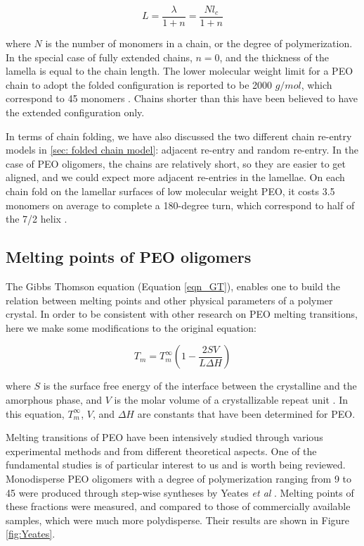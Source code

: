\begin{equation}
\label{eqn_thickness}
L = \dfrac{\lambda}{1+n} = \dfrac{N l_{c}}{1+n}
\end{equation}

\noindent
where $N$ is the number of monomers in a chain, or the degree of polymerization. In the special case of fully extended chains, $n = 0$, and the thickness of the lamella is equal to the chain length. The lower molecular weight limit for a PEO chain to adopt the folded configuration is reported to be 2000 $g/mol$, which correspond to 45 monomers \cite{Kovacs1975}. Chains shorter than this have been believed to have the extended configuration only.

In terms of chain folding, we have also discussed the two different chain re-entry models in \ref{sec: folded chain model}: adjacent re-entry and random re-entry. In the case of PEO oligomers, the chains are relatively short, so they are easier to get aligned, and we could expect more adjacent re-entries in the lamellae. On each chain fold on the lamellar surfaces of low molecular weight PEO, it costs 3.5 monomers on average to complete a 180-degree turn, which correspond to half of the 7/2 helix \cite{Buckley1976}.

\subsection{Melting points of PEO oligomers} \label{Tm and Yeates}

The Gibbs Thomson equation (Equation \ref{eqn_GT}), enables one to build the relation between melting points and other physical parameters of a polymer crystal. In order to be consistent with other research on PEO melting transitions, here we make some modifications to the original equation:

\begin{equation}
\label{eqn_GT2}
T_{m} = T_{m}^{\infty} (1 - \dfrac{2SV}{L \Delta H})
\end{equation}

\noindent
where $S$ is the surface free energy of the interface between the crystalline and the amorphous phase, and $V$ is the molar volume of a crystallizable repeat unit \cite{Pfefferkorn2011}. In this equation, $T_{m}^{\infty}$, $V$, and $\Delta H$ are constants that have been determined for PEO.

Melting transitions of PEO have been intensively studied through various experimental methods and from different theoretical aspects. One of the fundamental studies is of particular interest to us and is worth being reviewed. Monodisperse PEO oligomers with a degree of polymerization ranging from 9 to 45 were produced through step-wise syntheses by Yeates \textit{et al} \cite{Yeates1984}. Melting points of these fractions were measured, and compared to those of commercially available samples, which were much more polydisperse. Their results are shown in Figure \ref{fig:Yeates}.

